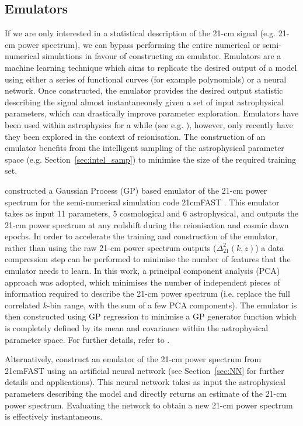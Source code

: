 \subsection{Emulators} \label{sec:emul}

If we are only interested in a statistical description of the 21-cm signal (e.g. 21-cm power spectrum), we can bypass performing the entire numerical or semi-numerical simulations in favour of constructing an emulator. Emulators are a machine learning technique which aims to replicate the desired output of a model using either a series of functional curves (for example polynomials) or a neural network. Once constructed, the emulator provides the desired output statistic describing the signal almost instantaneously given a set of input astrophysical parameters, which can drastically improve parameter exploration. Emulators have been used within astrophysics for a while (see e.g. \cite{Heitmann:2009,Agarwal:2012,Heitmann:2014,Heitmann:2016}), however, only recently have they been explored in the context of reionisation. The construction of an emulator benefits from the intelligent sampling of the astrophysical parameter space (e.g. Section~\ref{sec:intel_samp}) to minimise the size of the required training set.

\cite{Kern:2017} constructed a Gaussian Process (GP) based emulator of the 21-cm power spectrum for the semi-numerical simulation code 21cmFAST \cite{Mesinger:2007,Mesinger:2011}. This emulator takes as input 11 parameters, 5 cosmological and 6 astrophysical, and outputs the 21-cm power spectrum at any redshift during the  reionisation and cosmic dawn epochs. In order to accelerate the training and construction of the emulator, rather than using the raw 21-cm power spectrum outputs ($\Delta^{2}_{21}(k,z)$) a data compression step can be performed to minimise the number of features that the emulator needs to learn. In this work, a principal component analysis (PCA) approach was adopted, which minimises the number of independent pieces of information required to describe the 21-cm power spectrum (i.e. replace the full correlated $k$-bin range, with the sum of a few PCA components). The emulator is then constructed using GP regression to minimise a GP generator function which is completely defined by its mean and covariance within the astrophysical parameter space. For further details, refer to \cite{Kern:2017}.

Alternatively, \cite{Schmit:2018} construct an emulator of the 21-cm power spectrum from 21cmFAST using an artificial neural network (see Section~\ref{sec:NN} for further details and applications). This neural network takes as input the astrophysical parameters describing the model and directly returns an estimate of the 21-cm power spectrum. Evaluating the network to obtain a new 21-cm power spectrum is effectively instantaneous. 

